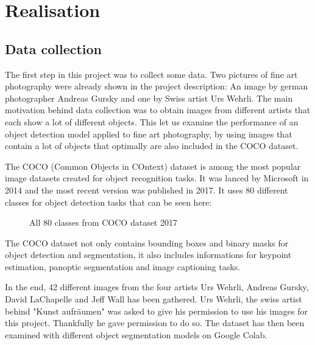 \chapter{Realisation}

\section{Data collection}

The first step in this project was to collect some data. Two pictures of fine art photography were already shown in the project description: An image by german photographer Andreas Gursky and one by Swiss artist Urs Wehrli. The main motivation behind data collection was to obtain images from different artists that each show a lot of different objects. This let us examine the performance of an object detection model applied to fine art photography, by using images that contain a lot of objects that optimally are also included in the COCO dataset.

The COCO (Common Objects in COntext) dataset is among the most popular image datasets created for object recognition tasks. It was lanced by Microsoft in 2014 and the most recent version was published in 2017. It uses 80 different classes for object detection tasks that can be seen here:

\begin{figure}[!h]
	\caption{\label{fig:input-image} All 80 classes from COCO dataset 2017}
\end{figure}

The COCO dataset not only contains bounding boxes and binary masks for object detection and segmentation, it also includes informations for keypoint estimation, panoptic segmentation and image captioning tasks.

In the end, 42 different images from the four artists Urs Wehrli, Andreas Gursky, David LaChapelle and Jeff Wall has been gathered. Urs Wehrli, the swiss artist behind "Kunst aufräumen" was asked to give his permission to use his images for this project. Thankfully he gave permission to do so. The dataset has then been examined with different object segmentation models on Google Colab.

